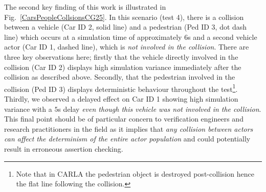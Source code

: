 \documentclass[letterpaper, 10 pt, journal, twoside]{IEEEtran}
\begin{document}
The second key finding of this work is illustrated in Fig.~\ref{CarsPeopleCollsionsCG25}. In this scenario (test 4), there is a collision between a vehicle (Car ID 2, solid line) and a pedestrian (Ped ID 3, dot dash line) which occurs at a simulation time of approximately $6$s and a second vehicle actor (Car ID 1, dashed line), which is \textit{not involved in the collision}. There are three key observations here; firstly that the vehicle directly involved in the collision (Car ID 2) displays high simulation variance immediately after the collision as described above. Secondly, that the pedestrian involved in the collision (Ped ID 3) displays deterministic behaviour throughout the test\footnote{Note that in CARLA the pedestrian object is destroyed post-collision hence the flat line following the collision.}. Thirdly, we observed a delayed effect on Car ID 1 showing high simulation variance with a $5$s delay \textit{even though this vehicle was not involved in the collision}. This final point should be of particular concern to verification engineers and research practitioners in the field as it implies that \textit{any collision between actors can affect the determinism of the entire actor population} and could potentially result in  erroneous assertion checking.





\end{document}
